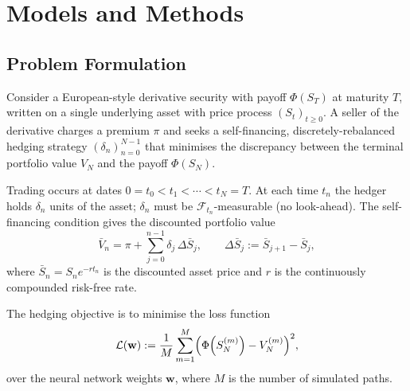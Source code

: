 %

\section{Models and Methods}
\label{sec:methods}

\subsection{Problem Formulation}
\label{subsec:problem}

Consider a European-style derivative security with payoff $\Phi(S_T)$ at maturity $T$,
written on a single underlying asset with price process $(S_t)_{t \ge 0}$. A seller of
the derivative charges a premium $\pi$ and seeks a self-financing, discretely-rebalanced
hedging strategy $(\delta_n)_{n=0}^{N-1}$ that minimises the discrepancy between the
terminal portfolio value $V_N$ and the payoff $\Phi(S_N)$.

Trading occurs at dates $0 = t_0 < t_1 < \cdots < t_N = T$. At each time $t_n$ the
hedger holds $\delta_n$ units of the asset; $\delta_n$ must be
$\mathcal{F}_{t_n}$-measurable (no look-ahead). The self-financing condition gives the
discounted portfolio value
\begin{equation}
    \bar{V}_n = \pi + \sum_{j=0}^{n-1} \delta_j \,\Delta\bar{S}_j,
    \qquad \Delta\bar{S}_j := \bar{S}_{j+1} - \bar{S}_j,
    \label{eq:portfolio}
\end{equation}
where $\bar{S}_n = S_n e^{-r t_n}$ is the discounted asset price and $r$ is the
continuously compounded risk-free rate.

The hedging objective is to minimise the loss function
\begin{equation}
    \mathcal{L}(\mathbf{w}) := \frac{1}{M}\sum_{m=1}^{M}
        \Bigl(\Phi\!\left(S_N^{(m)}\right) - V_N^{(m)}\Bigr)^2,
    \label{eq:loss}
\end{equation}
over the neural network weights $\mathbf{w}$, where $M$ is the number of simulated
paths.

